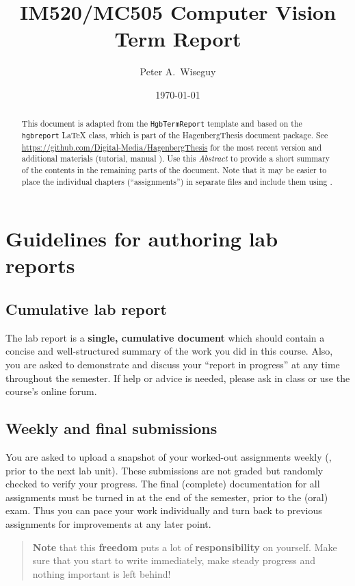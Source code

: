 \documentclass[notitlepage,english]{hgbreport}
\author{Peter A.\ Wiseguy}
\title{IM520/MC505 Computer Vision\\ %
			Term Report}
\date{\today}
\begin{document}

\maketitle
\thispagestyle{empty} 

\begin{abstract}\noindent
This document is adapted from the \texttt{HgbTermReport} template and based on the \texttt{hgb\-report} LaTeX class,
which is part of the \textsf{HagenbergThesis} document package.
See \url{https://github.com/Digital-Media/HagenbergThesis} for the most recent version
and additional materials (tutorial, manual \etc).
Use this \emph{Abstract} to provide a short summary of the contents in the remaining parts of the document.
Note that it may be easier to place the individual chapters (``assignments'') in separate files
and include them using \verb!!.
\end{abstract}


\tableofcontents


\chapter*{Guidelines for authoring lab reports}

\section*{Cumulative lab report}

The lab report is a \textbf{single, cumulative document} which should contain 
a concise and well-structured summary of the work you did in this course.
Also, you are asked to demonstrate and discuss your ``report in progress'' at any time
throughout the semester.
If help or advice is needed, please ask in class or use the course's online forum.


\section*{Weekly and final submissions}

You are asked to upload a snapshot of your worked-out assignments weekly (\ie, prior to the next lab unit). 
These submissions are not graded but randomly checked to verify your progress.
The final (complete) documentation for all assignments must be turned in at 
the end of the semester, prior to the (oral) exam. 
Thus you can pace your work individually and turn back to previous assignments 
for improvements at any later point.
%
\begin{quote}
\textbf{Note} that this \textbf{freedom} puts a lot of \textbf{responsibility} on yourself. Make sure
that you start to write immediately, make steady progress and nothing important is left behind!
\end{quote}
\end{document}
